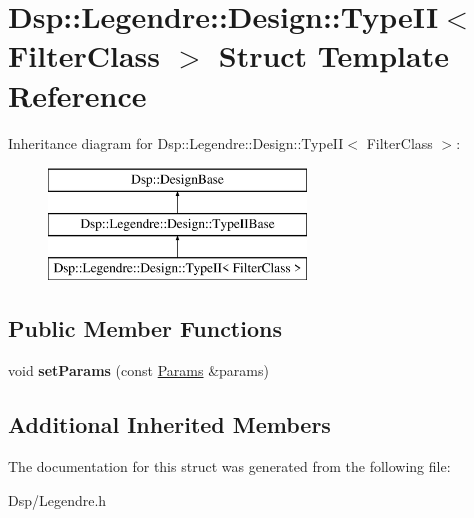 \hypertarget{structDsp_1_1Legendre_1_1Design_1_1TypeII}{\section{Dsp\-:\-:Legendre\-:\-:Design\-:\-:Type\-I\-I$<$ Filter\-Class $>$ Struct Template Reference}
\label{structDsp_1_1Legendre_1_1Design_1_1TypeII}
}
Inheritance diagram for Dsp\-:\-:Legendre\-:\-:Design\-:\-:Type\-I\-I$<$ Filter\-Class $>$\-:\begin{figure}[H]
\begin{center}
\leavevmode
\includegraphics[height=3.000000cm]{structDsp_1_1Legendre_1_1Design_1_1TypeII}
\end{center}
\end{figure}
\subsection*{Public Member Functions}
\begin{DoxyCompactItemize}
\item 
\hypertarget{structDsp_1_1Legendre_1_1Design_1_1TypeII_a9eff81b83bd3e9cfd91799ca50c3522b}{void {\bfseries set\-Params} (const \hyperlink{structDsp_1_1Params}{Params} \&params)}\label{structDsp_1_1Legendre_1_1Design_1_1TypeII_a9eff81b83bd3e9cfd91799ca50c3522b}

\end{DoxyCompactItemize}
\subsection*{Additional Inherited Members}


The documentation for this struct was generated from the following file\-:\begin{DoxyCompactItemize}
\item 
Dsp/Legendre.\-h\end{DoxyCompactItemize}
